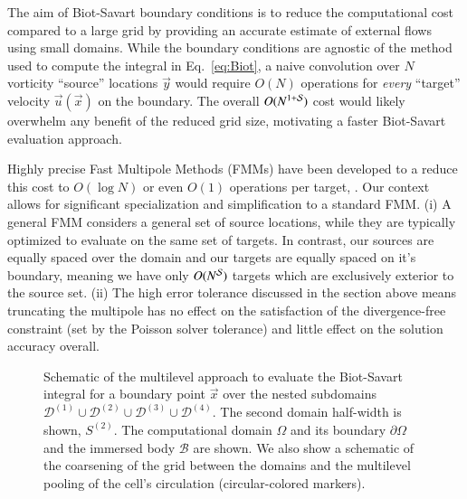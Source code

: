 \documentclass[final,1p,times]{elsarticle}
\begin{document}
The aim of Biot-Savart boundary conditions is to reduce the computational cost compared to a large grid by providing an accurate estimate of external flows using small domains. While the boundary conditions are agnostic of the method used to compute the integral in Eq.~\ref{eq:Biot}, a naive convolution over $N$ vorticity ``source'' locations $\vec y$ would require $O(N)$ operations for \textit{every} ``target'' velocity $\vec u(\vec x)$ on the boundary. The overall $O(N^{1+\cal S})$ cost would likely overwhelm any benefit of the reduced grid size, motivating a faster Biot-Savart evaluation approach.


Highly precise Fast Multipole Methods (FMMs) have been developed to a reduce this cost to $O(\log N)$ or even $O(1)$ operations per target, \cite{Greencard1987ASimulations,Ying2004ADimensions, Fong2009TheMethod}. Our context allows for significant specialization and simplification to a standard FMM. (i) A general FMM considers a general set of source locations, while they are typically optimized to evaluate on the same set of targets. In contrast, our sources are equally spaced over the domain and our targets are equally spaced on it's boundary, meaning we have only $O(N^{\cal S})$ targets which are exclusively exterior to the source set. (ii) The high error tolerance discussed in the section above means truncating the multipole has no effect on the satisfaction of the divergence-free constraint (set by the Poisson solver tolerance) and little effect on the solution accuracy overall.

\begin{figure}
    \centering
    \def\svgwidth{0.7\columnwidth}
    
    \caption{Schematic of the multilevel approach to evaluate the Biot-Savart integral for a boundary point $\vec x$ over the nested subdomains $\mathcal{D}^{(1)} \cup \mathcal{D}^{(2)} \cup \mathcal{D}^{(3)} \cup \mathcal{D}^{(4)}$. The second domain half-width is shown, ${S}^{(2)}$. The computational domain $\Omega$ and its boundary $\partial\Omega$ and the immersed body $\mathcal{B}$ are shown. We also show a schematic of the coarsening of the grid between the domains and the multilevel pooling of the cell's circulation (circular-colored markers). 
    }
    \label{Fig_2}
\end{figure}
\end{document}
